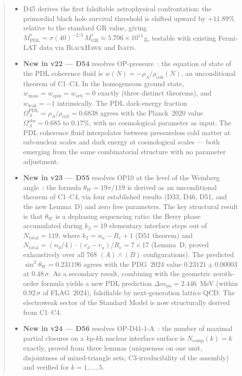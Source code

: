 \documentclass[11pt,a4paper]{article}
\theoremstyle{plain}
\theoremstyle{definition}
\theoremstyle{remark}
\newcommand{\rhocoh}{\rho_{\mathrm{coh}}}
\begin{document}
\begin{abstract}
\begin{itemize}
\item D45 derives the first falsifiable astrophysical confrontation: the primordial black hole survival threshold is shifted upward by $+11.89\%$ relative to the standard GR value, giving $M^*_{\mathrm{PDL}} = \sigma(40)^{-2/3}\,M^*_{\mathrm{GR}} \approx 5.706 \times 10^{14}$\,g, testable with existing Fermi-LAT data via \textsc{BlackHawk} and \textsc{Isatis}.
\item \textbf{New in v22 --- D54} resolves OP-pressure~\cite{D54}: the equation of state of the PDL coherence fluid is $w(N) = -\rho_\Lambda/\rhocoh(N)$, an unconditional theorem of C1--C4. In the homogeneous ground state, $w_{\mathrm{mass}} = w_{\mathrm{spin}} = w_{\mathrm{orb}} = 0$ exactly (three distinct theorems), and $w_{\mathrm{leak}} = -1$ intrinsically. The PDL dark-energy fraction $\Omega_\Lambda^{\mathrm{PDL}} = \rho_\Lambda/\rho_{\mathrm{crit}} = 0.6838$ agrees with the Planck~2020 value $\Omega_\Lambda^{\mathrm{obs}} = 0.685$ to $0.17\%$, with no cosmological parameter as input. The PDL coherence fluid interpolates between pressureless cold matter at sub-nuclear scales and dark energy at cosmological scales --- both emerging from the same combinatorial structure with no parameter adjustment.
\item \textbf{New in v23 --- D55} resolves OP10 at the level of the Weinberg angle~\cite{D55}: the formula $\theta_W = 19\pi/119$ is derived as an unconditional theorem of C1--C4, via four established results (D33, D46, D51, and the new Lemma~D) and zero free parameters. The key structural result is that $\theta_W$ is a dephasing sequencing ratio: the Berry phase accumulated during $k_2 = 19$ elementary interface steps out of $N_{\mathrm{total}} = 119$, where $k_2 = n_u - R_e + 1$ (D51 theorem) and $N_{\mathrm{total}} = (n_d/4)\cdot(r_d-r_u)/R_e = 7\times 17$ (Lemma~D, proved exhaustively over all 768 $(A)\wedge(B)$ configurations). The predicted $\sin^2\theta_W = 0.231196$ agrees with the PDG~2024 value $0.23121\pm0.00003$ at $0.48\,\sigma$. As a secondary result, combining with the geometric zeroth-order formula yields a new PDL prediction $\Delta m_{\mathrm{iso}} = 2.446$~MeV (within $0.92\,\sigma$ of FLAG~2024), falsifiable by next-generation lattice QCD. The electroweak sector of the Standard Model is now structurally derived from C1--C4.
\item \textbf{New in v24 --- D56} resolves OP-D41-1-A~\cite{D56}: the number of maximal partial closures on a $k$p-$k$h nuclear interface surface is $N_{\mathrm{comp}}(k)=k$ exactly, proved from three lemmas (uniqueness on one unit, disjointness of mixed-triangle sets, C3-irreducibility of the assembly) and verified for $k=1,\ldots,5$.

\end{itemize}
\end{abstract}
\end{document}
